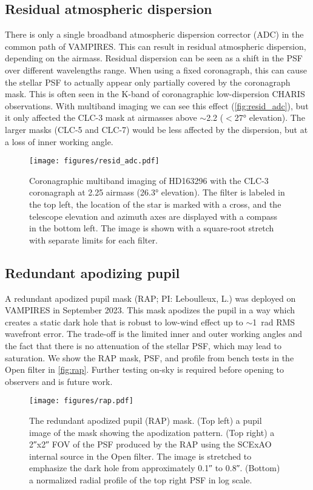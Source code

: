 \subsection{Residual atmospheric dispersion}

There is only a single broadband atmospheric dispersion corrector (ADC) in the common path of VAMPIRES. This can result in residual atmospheric dispersion, depending on the airmass. Residual dispersion can be seen as a shift in the PSF over different wavelengths range. When using a fixed coronagraph, this can cause the stellar PSF to actually appear only partially covered by the coronagraph mask. This is often seen in the K-band of coronagraphic low-dispersion CHARIS observations. With multiband imaging we can see this effect (\autoref{fig:resid_adc}), but it only affected the CLC-3 mask at airmasses above $\sim$\num{2.2} ($<$\ang{27} elevation). The larger masks (CLC-5 and CLC-7) would be less affected by the dispersion, but at a loss of inner working angle.

\begin{figure}
    \centering
    \texttt{[image: figures/resid\_adc.pdf]}
    \caption{Coronagraphic multiband imaging of HD163296 with the CLC-3 coronagraph at 2.25 airmass (\ang{26.3} elevation). The filter is labeled in the top left, the location of the star is marked with a cross, and the telescope elevation and azimuth axes are displayed with a compass in the bottom left. The image is shown with a square-root stretch with separate limits for each filter.\label{fig:resid_adc}}
\end{figure}

\subsection{Redundant apodizing pupil}

A redundant apodized pupil mask (RAP; PI: Leboulleux, L.) was deployed on VAMPIRES in September 2023. This mask apodizes the pupil in a way which creates a static dark hole that is robust to low-wind effect up to $\sim$\SI{1}{rad} RMS wavefront error. The trade-off is the limited inner and outer working angles and the fact that there is no attenuation of the stellar PSF, which may lead to saturation. We show the RAP mask, PSF, and profile from bench tests in the Open filter in \autoref{fig:rap}. Further testing on-sky is required before opening to observers and is future work.

\begin{figure}
    \centering
    \texttt{[image: figures/rap.pdf]}
    \caption{The redundant apodized pupil (RAP) mask. (Top left) a pupil image of the mask showing the apodization pattern. (Top right) a \ang{;;2}x\ang{;;2} FOV of the PSF produced by the RAP using the SCExAO internal source in the Open filter. The image is stretched to emphasize the dark hole from approximately \ang{;;0.1} to \ang{;;0.8}. (Bottom) a normalized radial profile of the top right PSF in log scale.\label{fig:rap}}
\end{figure}